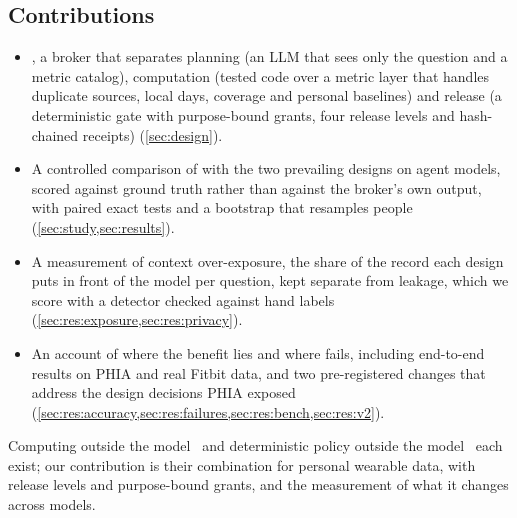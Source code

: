 \subsection{Contributions}

\begin{itemize}[leftmargin=1.4em,itemsep=2pt]
\item \sys{}, a broker that separates planning (an LLM that sees only the question and a metric catalog),
  computation (tested code over a metric layer that handles duplicate sources, local days, coverage and personal
  baselines) and release (a deterministic gate with purpose-bound grants, four release levels and hash-chained
  receipts) (\cref{sec:design}).
\item A controlled comparison of \sys{} with the two prevailing designs on \nModels{} agent models, scored against
  ground truth rather than against the broker's own output, with paired exact tests and a bootstrap that resamples
  people (\cref{sec:study,sec:results}).
\item A measurement of context over-exposure, the share of the record each design puts in front of the model per
  question, kept separate from leakage, which we score with a detector checked against hand labels
  (\cref{sec:res:exposure,sec:res:privacy}).
\item An account of where the benefit lies and where \sys{} fails, including end-to-end results on PHIA and real
  Fitbit data, and two pre-registered changes that address the design decisions PHIA exposed
  (\cref{sec:res:accuracy,sec:res:failures,sec:res:bench,sec:res:v2}).
\end{itemize}

Computing outside the model~\citep{gao2022pal,chen2023pot,merrill2024phia} and deterministic policy outside the
model~\citep{shi2025progent,debenedetti2025camel,kodathala2026aiauthz} each exist; our contribution is their
combination for personal wearable data, with release levels and purpose-bound grants, and the measurement of what it
changes across models.
